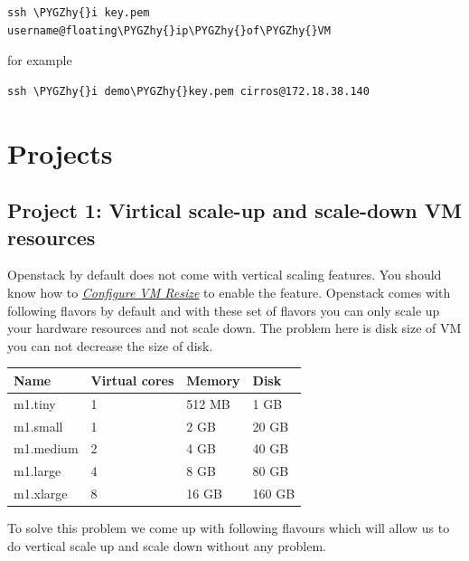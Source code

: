 \documentclass[letterpaper,10pt,english]{sphinxmanual}
\def\PYGZhy{\char`\-}
\begin{document}
\begin{Verbatim}[commandchars=\\\{\}]
ssh \PYGZhy{}i key.pem username@floating\PYGZhy{}ip\PYGZhy{}of\PYGZhy{}VM
\end{Verbatim}

for example

\begin{Verbatim}[commandchars=\\\{\}]
ssh \PYGZhy{}i demo\PYGZhy{}key.pem cirros@172.18.38.140
\end{Verbatim}


\chapter{Projects}
\label{_source/projects::doc}\label{_source/projects:projects}

\section{Project 1: Virtical scale-up and scale-down VM resources}
\label{_source/projects/project1:project-1-virtical-scale-up-and-scale-down-vm-resources}\label{_source/projects/project1::doc}
Openstack by default does not come with vertical scaling features. You should know how to {\hyperref[_source/installation_guide/vm_resize:vm-resize]{\emph{Configure VM Resize}}} to enable the feature. Openstack comes with following flavors by default and with these set of flavors you can only scale up your hardware resources and not scale down. The problem here is disk size of VM you can not decrease the size of disk.

\begin{tabulary}{\linewidth}{|L|L|L|L|}
\hline
\textsf{\relax 
Name
} & \textsf{\relax 
Virtual cores
} & \textsf{\relax 
Memory
} & \textsf{\relax 
Disk
}\\
\hline
m1.tiny
 & 
1
 & 
512 MB
 & 
1 GB
\\
\hline
m1.small
 & 
1
 & 
2 GB
 & 
20 GB
\\
\hline
m1.medium
 & 
2
 & 
4 GB
 & 
40 GB
\\
\hline
m1.large
 & 
4
 & 
8 GB
 & 
80 GB
\\
\hline
m1.xlarge
 & 
8
 & 
16 GB
 & 
160 GB
\\
\hline\end{tabulary}


To solve this problem we come up with following flavours which will allow us to do vertical scale up and scale down without any problem.
\end{document}
